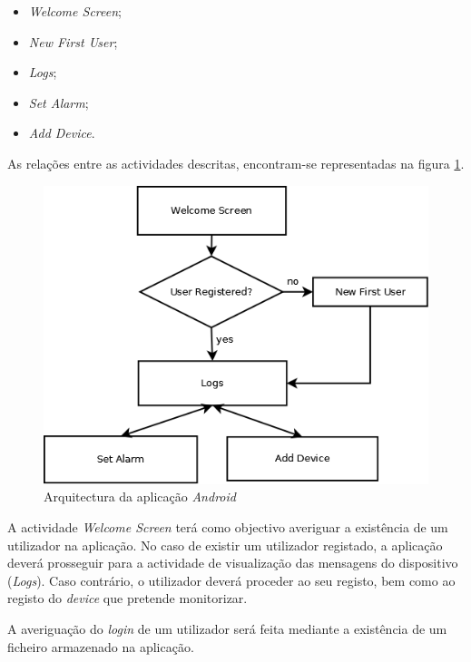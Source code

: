 \documentclass[a4paper]{article}
\begin{document}
\begin{itemize}
\item \textit{Welcome Screen};
\item \textit{New First User};
\item \textit{Logs};
\item \textit{Set Alarm};
\item \textit{Add Device}.
\end{itemize}

\vspace{35mm}

As relações entre as actividades descritas, encontram-se representadas na figura \ref{fig:app_android_geral}.

\vspace{5mm}

\begin{figure}[hb]
  \centering
  \includegraphics[scale=0.40]{App_geral.png}
  \caption{Arquitectura da aplicação \textit{Android}}
  \label{fig:app_android_geral}
\end{figure}

A actividade \textit{Welcome Screen} terá como objectivo averiguar a existência de um utilizador na aplicação. No caso de existir um utilizador registado, a aplicação deverá prosseguir para a actividade de visualização das mensagens do dispositivo (\textit{Logs}). Caso contrário, o utilizador deverá proceder ao seu registo, bem como ao registo do \textit{device} que pretende monitorizar.

A averiguação do \textit{login} de um utilizador será feita mediante a existência de um ficheiro armazenado na aplicação.
\end{document}

